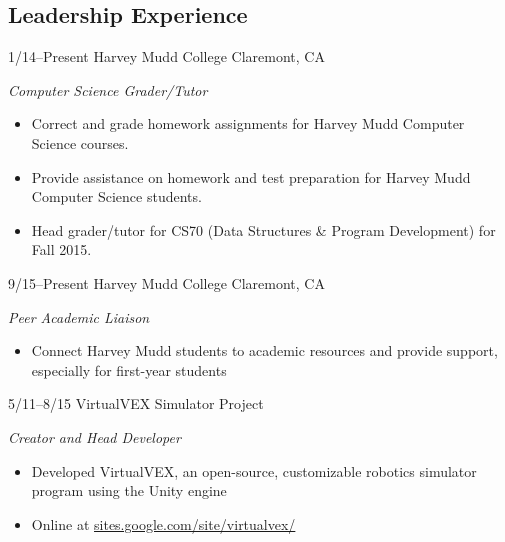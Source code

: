 \documentclass[]{friggeri-cv} %
\begin{document}
\pagebreak

\subsection{Leadership Experience}

\begin{entrylist}

\entry
{1/14--Present}
{Harvey Mudd College}
{Claremont, CA}
{\emph{Computer Science Grader/Tutor}
\begin{itemize}
\item Correct and grade homework assignments for Harvey Mudd Computer Science courses.
\item Provide assistance on homework and test preparation for Harvey Mudd Computer Science students.
\item Head grader/tutor for CS70 (Data Structures \& Program Development) for Fall 2015.
\end{itemize}}


\entry
{9/15--Present}
{Harvey Mudd College}
{Claremont, CA}
{\emph{Peer Academic Liaison}
\begin{itemize}
\item Connect Harvey Mudd students to academic resources and provide support, especially for first-year students
\end{itemize}}


\entry
{5/11--8/15}
{VirtualVEX Simulator Project}
{}
{\emph{Creator and Head Developer}
\begin{itemize}
\item Developed VirtualVEX, an open-source, customizable robotics simulator program using the Unity engine
\item Online at \href{https://sites.google.com/site/virtualvex/}{sites.google.com/site/virtualvex/}
\end{itemize}}

\end{entrylist}
\end{document}

